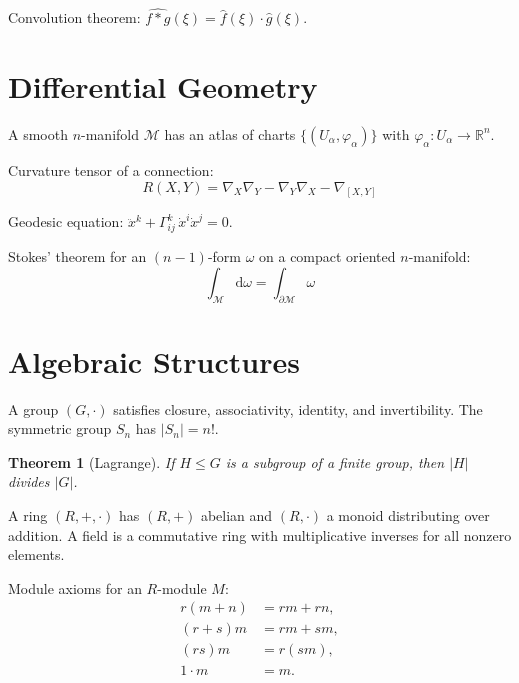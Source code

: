 \documentclass[
    language=english,
    doctype=article,
    institution=none,
    titlestyle=book,
]{../../omnilatex}
\theoremstyle{plain}
\newtheorem{theorem}{Theorem}[section]
\theoremstyle{definition}
\theoremstyle{remark}
\begin{document}
Convolution theorem: $\widehat{f * g}(\xi) = \hat{f}(\xi) \cdot \hat{g}(\xi)$.

\section{Differential Geometry}
\label{sec:differential-geometry}

A smooth $n$-manifold $\mathcal{M}$ has an atlas of charts
$\{(U_\alpha, \varphi_\alpha)\}$ with $\varphi_\alpha\colon U_\alpha \to \mathbb{R}^n$.

Curvature tensor of a connection:
\[
    R(X, Y) = \nabla_X \nabla_Y - \nabla_Y \nabla_X - \nabla_{[X,Y]}
\]

Geodesic equation: $\ddot{x}^k + \Gamma^k_{ij}\, \dot{x}^i \dot{x}^j = 0$.

Stokes' theorem for an $(n{-}1)$-form $\omega$ on a compact oriented $n$-manifold:
\[
    \int_{\mathcal{M}} \mathup{d}\omega = \int_{\partial\mathcal{M}} \omega
\]

\section{Algebraic Structures}
\label{sec:algebra}

A group $(G, \cdot)$ satisfies closure, associativity, identity, and invertibility.
The symmetric group $S_n$ has $|S_n| = n!$.

\begin{theorem}[Lagrange]\label{thm:lagrange}
If $H \leq G$ is a subgroup of a finite group, then $|H|$ divides $|G|$.
\end{theorem}

A ring $(R, +, \cdot)$ has $(R, +)$ abelian and $(R, \cdot)$ a monoid distributing over addition.
A field is a commutative ring with multiplicative inverses for all nonzero elements.

Module axioms for an $R$-module $M$:
\begin{align}
    r(m + n) &= rm + rn, \label{eq:module1}\\
    (r + s)m &= rm + sm, \label{eq:module2}\\
    (rs)m &= r(sm), \label{eq:module3}\\
    1 \cdot m &= m. \label{eq:module4}
\end{align}
\end{document}

